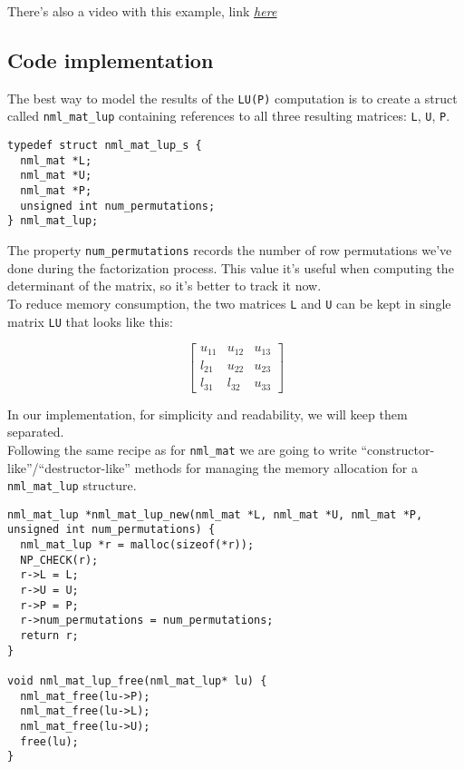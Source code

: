 There's also a video  with this example, link \href{https://www.youtube.com/watch?v=f6RT4BI4S7M}{\underline{\it here}}

\subsection{Code implementation}

The best way to model the results of the {\tt LU(P)} computation is to create a struct called {\tt nml\_mat\_lup} containing references to all three resulting matrices: {\tt L}, {\tt U}, {\tt P}.
\\

\begin{verbatim}
typedef struct nml_mat_lup_s {
  nml_mat *L;
  nml_mat *U;
  nml_mat *P;
  unsigned int num_permutations;
} nml_mat_lup;
\end{verbatim}

The property {\tt num\_permutations} records the number of row permutations we’ve done during the factorization process. This value it’s useful when computing the determinant of the matrix, so it’s better to track it now.
\\

To reduce memory consumption, the two matrices {\tt L} and {\tt U} can be kept in single matrix {\tt LU} that looks like this:

$$
\begin{bmatrix}
u_{11} & u_{12} & u_{13} \\
l_{21} & u_{22} & u_{23} \\
l_{31} & l_{32} & u_{33}
\end{bmatrix}
$$

In our implementation, for simplicity and readability, we will keep them separated.
\\

Following the same recipe as for {\tt nml\_mat} we are going to write ``constructor-like''/``destructor-like'' methods for managing the memory allocation for a {\tt nml\_mat\_lup} structure.

\begin{verbatim}
nml_mat_lup *nml_mat_lup_new(nml_mat *L, nml_mat *U, nml_mat *P, unsigned int num_permutations) {
  nml_mat_lup *r = malloc(sizeof(*r));
  NP_CHECK(r);
  r->L = L;
  r->U = U;
  r->P = P;
  r->num_permutations = num_permutations;
  return r;
}

void nml_mat_lup_free(nml_mat_lup* lu) {
  nml_mat_free(lu->P);
  nml_mat_free(lu->L);
  nml_mat_free(lu->U);
  free(lu);
} 
\end{verbatim}

